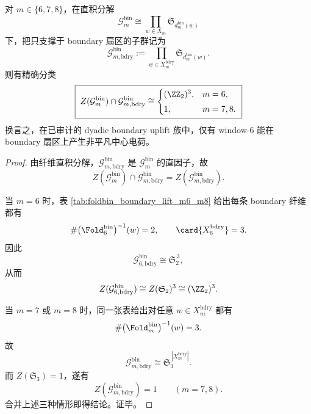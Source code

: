 \begin{theorem}\label{thm:window6-boundary-central-charge-unique-among-audited-lifts}
对 \(m\in\{6,7,8\}\)，在直积分解
\[
\mathcal G_m^{\mathrm{bin}}
\cong
\prod_{w\in X_m}\mathfrak S_{d_m^{\mathrm{bin}}(w)}
\]
下，把只支撑于 boundary 扇区的子群记为
\[
\mathcal G_{m,\mathrm{bdry}}^{\mathrm{bin}}
:=
\prod_{w\in X_m^{\mathrm{bdry}}}\mathfrak S_{d_m^{\mathrm{bin}}(w)}.
\]
则有精确分类
\[
\boxed{\;
Z(\mathcal G_m^{\mathrm{bin}})
\cap
\mathcal G_{m,\mathrm{bdry}}^{\mathrm{bin}}
\cong
\begin{cases}
(\ZZ_2)^3,& m=6,\\[1mm]
1,& m=7,8.
\end{cases}
\;}
\]
换言之，在已审计的 dyadic boundary uplift 族中，仅有 window-\(6\) 能在 boundary 扇区上产生非平凡中心电荷。
\end{theorem}
\begin{proof}
由纤维直积分解，\(\mathcal G_{m,\mathrm{bdry}}^{\mathrm{bin}}\) 是 \(\mathcal G_m^{\mathrm{bin}}\) 的直因子，故
\[
Z(\mathcal G_m^{\mathrm{bin}})
\cap
\mathcal G_{m,\mathrm{bdry}}^{\mathrm{bin}}
=
Z(\mathcal G_{m,\mathrm{bdry}}^{\mathrm{bin}}).
\]

当 \(m=6\) 时，表 \ref{tab:foldbin_boundary_lift_m6_m8} 给出每条 boundary 纤维都有
\[
\#\bigl(\Fold_6^{\mathrm{bin}}\bigr)^{-1}(w)=2,
\qquad
\card{X_6^{\mathrm{bdry}}}=3.
\]
因此
\[
\mathcal G_{6,\mathrm{bdry}}^{\mathrm{bin}}\cong \mathfrak S_2^{\,3},
\]
从而
\[
Z(\mathcal G_{6,\mathrm{bdry}}^{\mathrm{bin}})
\cong
Z(\mathfrak S_2)^{3}
\cong
(\ZZ_2)^3.
\]

当 \(m=7\) 或 \(m=8\) 时，同一张表给出对任意 \(w\in X_m^{\mathrm{bdry}}\) 都有
\[
\#\bigl(\Fold_m^{\mathrm{bin}}\bigr)^{-1}(w)=3.
\]
故
\[
\mathcal G_{m,\mathrm{bdry}}^{\mathrm{bin}}
\cong
\mathfrak S_3^{\,|X_m^{\mathrm{bdry}}|}.
\]
而 \(Z(\mathfrak S_3)=1\)，遂有
\[
Z(\mathcal G_{m,\mathrm{bdry}}^{\mathrm{bin}})=1
\qquad(m=7,8).
\]
合并上述三种情形即得结论。证毕。
\end{proof}



